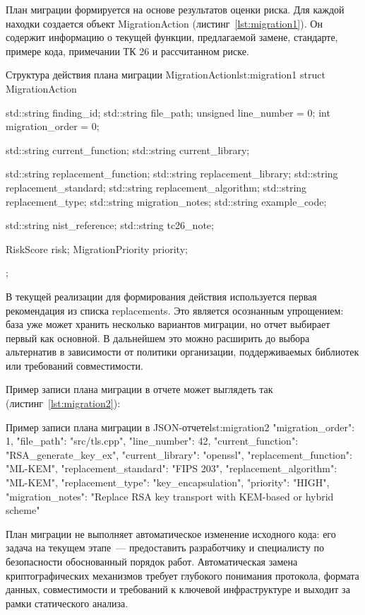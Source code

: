 \documentclass{itmo-vkr}
\begin{document}
План миграции формируется на основе результатов оценки риска. Для каждой находки создается объект MigrationAction (листинг~\ref{lst:migration1}). Он содержит информацию о текущей функции, предлагаемой замене, стандарте, примере кода, примечании ТК 26 и рассчитанном риске.

\begin{itmolisting}[C++]{Структура действия плана миграции MigrationAction}{lst:migration1}
struct MigrationAction {
	std::string finding_id;
	std::string file_path;
	unsigned line_number = 0;
	int migration_order = 0;
	
	std::string current_function;
	std::string current_library;
	
	std::string replacement_function;
	std::string replacement_library;
	std::string replacement_standard;
	std::string replacement_algorithm;
	std::string replacement_type;
	std::string migration_notes;
	std::string example_code;
	
	std::string nist_reference;
	std::string tc26_note;
	
	RiskScore risk;
	MigrationPriority priority;
};
\end{itmolisting}

В текущей реализации для формирования действия используется первая рекомендация из списка replacements. Это является осознанным упрощением: база уже может хранить несколько вариантов миграции, но отчет выбирает первый как основной. В дальнейшем это можно расширить до выбора альтернатив в зависимости от политики организации, поддерживаемых библиотек или требований совместимости.

Пример записи плана миграции в отчете может выглядеть так (листинг~\ref{lst:migration2}):

\begin{itmolisting}[JSON]{Пример записи плана миграции в JSON-отчете}{lst:migration2}
{
	"migration_order": 1,
	"file_path": "src/tls.cpp",
	"line_number": 42,
	"current_function": "RSA_generate_key_ex",
	"current_library": "openssl",
	"replacement_function": "ML-KEM",
	"replacement_standard": "FIPS 203",
	"replacement_algorithm": "ML-KEM",
	"replacement_type": "key_encapsulation",
	"priority": "HIGH",
	"migration_notes": "Replace RSA key transport with KEM-based or hybrid scheme"
}
\end{itmolisting}

План миграции не выполняет автоматическое изменение исходного кода: его задача на текущем этапе~--- предоставить разработчику и специалисту по безопасности обоснованный порядок работ. Автоматическая замена криптографических механизмов требует глубокого понимания протокола, формата данных, совместимости и требований к ключевой инфраструктуре и выходит за рамки статического анализа.
\end{document}
